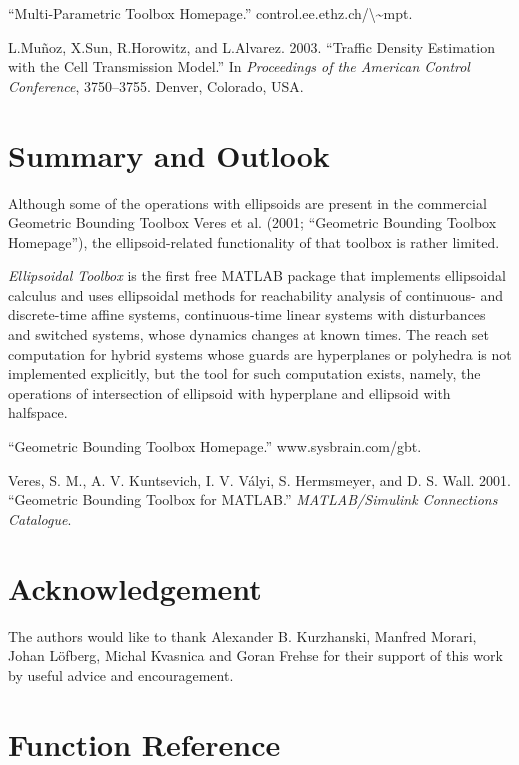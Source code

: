 \documentclass[letterpaper,10pt,english]{sphinxmanual}
\begin{document}
“Multi-Parametric Toolbox Homepage.” control.ee.ethz.ch/\textbackslash{}\textasciitilde{}mpt.

L.Muñoz, X.Sun, R.Horowitz, and L.Alvarez. 2003. “Traffic Density
Estimation with the Cell Transmission Model.” In \emph{Proceedings of the
American Control Conference}, 3750–3755. Denver, Colorado, USA.


\chapter{Summary and Outlook}
\label{chap_summary::doc}\label{chap_summary:summary-and-outlook}
Although some of the operations with ellipsoids are present in the
commercial Geometric Bounding Toolbox Veres et al. (2001; “Geometric
Bounding Toolbox Homepage”), the ellipsoid-related functionality of that
toolbox is rather limited.

\emph{Ellipsoidal Toolbox} is the first free MATLAB package that implements
ellipsoidal calculus and uses ellipsoidal methods for reachability
analysis of continuous- and discrete-time affine systems,
continuous-time linear systems with disturbances and switched systems,
whose dynamics changes at known times. The reach set computation for
hybrid systems whose guards are hyperplanes or polyhedra is not
implemented explicitly, but the tool for such computation exists,
namely, the operations of intersection of ellipsoid with hyperplane and
ellipsoid with halfspace.

“Geometric Bounding Toolbox Homepage.” www.sysbrain.com/gbt.

Veres, S. M., A. V. Kuntsevich, I. V. Vályi, S. Hermsmeyer, and D. S.
Wall. 2001. “Geometric Bounding Toolbox for MATLAB.” \emph{MATLAB/Simulink
Connections Catalogue}.


\chapter{Acknowledgement}
\label{chap_acknowledge::doc}\label{chap_acknowledge:acknowledgement}
The authors would like to thank Alexander B. Kurzhanski, Manfred Morari,
Johan Löfberg, Michal Kvasnica and Goran Frehse for their support of
this work by useful advice and encouragement.


\chapter{Function Reference}
\label{chap_func::doc}\label{chap_func:function-reference}
\end{document}
